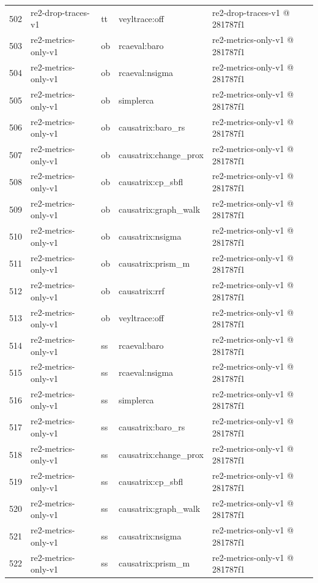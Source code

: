 \begin{longtable}{@{}r>{\raggedright\arraybackslash}p{87.0pt}>{\raggedright\arraybackslash}p{18.0pt}>{\raggedright\arraybackslash}p{63.0pt}>{\raggedright\arraybackslash}p{108.0pt}@{}}
502 & re2-drop-traces-v1 & tt & veyltrace:off & re2-drop-traces-v1 @ 281787f1 \\
503 & re2-metrics-only-v1 & ob & rcaeval:baro & re2-metrics-only-v1 @ 281787f1 \\
504 & re2-metrics-only-v1 & ob & rcaeval:nsigma & re2-metrics-only-v1 @ 281787f1 \\
505 & re2-metrics-only-v1 & ob & simplerca & re2-metrics-only-v1 @ 281787f1 \\
506 & re2-metrics-only-v1 & ob & causatrix:baro\_rs & re2-metrics-only-v1 @ 281787f1 \\
507 & re2-metrics-only-v1 & ob & causatrix:change\_prox & re2-metrics-only-v1 @ 281787f1 \\
508 & re2-metrics-only-v1 & ob & causatrix:cp\_sbfl & re2-metrics-only-v1 @ 281787f1 \\
509 & re2-metrics-only-v1 & ob & causatrix:graph\_walk & re2-metrics-only-v1 @ 281787f1 \\
510 & re2-metrics-only-v1 & ob & causatrix:nsigma & re2-metrics-only-v1 @ 281787f1 \\
511 & re2-metrics-only-v1 & ob & causatrix:prism\_m & re2-metrics-only-v1 @ 281787f1 \\
512 & re2-metrics-only-v1 & ob & causatrix:rrf & re2-metrics-only-v1 @ 281787f1 \\
513 & re2-metrics-only-v1 & ob & veyltrace:off & re2-metrics-only-v1 @ 281787f1 \\
514 & re2-metrics-only-v1 & ss & rcaeval:baro & re2-metrics-only-v1 @ 281787f1 \\
515 & re2-metrics-only-v1 & ss & rcaeval:nsigma & re2-metrics-only-v1 @ 281787f1 \\
516 & re2-metrics-only-v1 & ss & simplerca & re2-metrics-only-v1 @ 281787f1 \\
517 & re2-metrics-only-v1 & ss & causatrix:baro\_rs & re2-metrics-only-v1 @ 281787f1 \\
518 & re2-metrics-only-v1 & ss & causatrix:change\_prox & re2-metrics-only-v1 @ 281787f1 \\
519 & re2-metrics-only-v1 & ss & causatrix:cp\_sbfl & re2-metrics-only-v1 @ 281787f1 \\
520 & re2-metrics-only-v1 & ss & causatrix:graph\_walk & re2-metrics-only-v1 @ 281787f1 \\
521 & re2-metrics-only-v1 & ss & causatrix:nsigma & re2-metrics-only-v1 @ 281787f1 \\
522 & re2-metrics-only-v1 & ss & causatrix:prism\_m & re2-metrics-only-v1 @ 281787f1 \\

\end{longtable}

